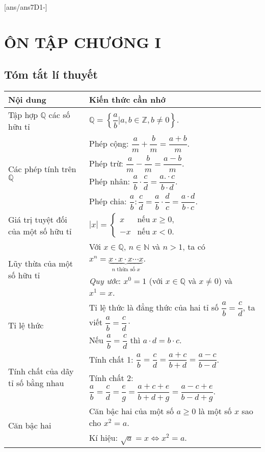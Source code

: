 [ans/ans7D1-]
\section{ÔN TẬP CHƯƠNG I}
\subsection{Tóm tắt lí thuyết}
\begin{center}
{\renewcommand{\arraystretch}{2.1}
\begin{tabular}{| l | l |}
 \hline
\hspace*{2cm}
\textbf{Nội dung}
&\hspace*{3cm}\textbf{Kiến thức cần nhớ}\\
 \hline
Tập hợp $\mathbb{Q}$ các số hữu tỉ&$\mathbb{Q}=\left\{\dfrac{a}{b}\vert a,b\in\mathbb{Z}, b\ne 0\right\}$.\\
\hline
\multirow{4}{5cm}{Các phép tính trên $\mathbb{Q}$}&Phép cộng: $\dfrac{a}{m}+\dfrac{b}{m}=\dfrac{a+b}{m}$.\\&Phép trừ: $\dfrac{a}{m}-\dfrac{b}{m}=\dfrac{a-b}{m}$.\\&Phép nhân: $\dfrac{a}{b}\cdot\dfrac{c}{d}=\dfrac{a.\cdot c}{b\cdot d}$.\\&Phép chia: $\dfrac{a}{b}:\dfrac{c}{d}=\dfrac{a}{b}\cdot\dfrac{d}{c}=\dfrac{a\cdot d}{b\cdot c}$.\\
\hline
Giá trị tuyệt đối của một số hữu tỉ&$|x|=\begin{cases}x&\text{nếu}\; x\ge 0,\\ -x&\text{nếu}\; x<0.\end{cases}$\\
\hline
\multirow{2}{5cm}{Lũy thừa của một số hữu tỉ}&Với $x\in\mathbb{Q}$, $n\in\mathbb{N}$ và $n>1$, ta có $x^n=\underbrace{x\cdot x\cdot x\cdots x}_{n\;\text{thừa số}\;x}$.\\&\textit{Quy ước}: $x^0=1$ (với $x\in\mathbb{Q}$ và $x\ne 0$) và $x^1=x$.\\
\hline
\multirow{2}{5cm}{Tỉ lệ thức}&Tỉ lệ thức là đẳng thức của hai tỉ số $\dfrac{a}{b}=\dfrac{c}{d}$, ta viết $\dfrac{a}{b}=\dfrac{c}{d}\cdot$\\&Nếu $\dfrac{a}{b}=\dfrac{c}{d}$ thì $a\cdot d=b\cdot c$.\\
\hline
\multirow{2}{6.3cm}{Tính chất của dãy tỉ số bằng nhau}&Tính chất 1: $\dfrac{a}{b}=\dfrac{c}{d}=\dfrac{a+c}{b+d}=\dfrac{a-c}{b-d}$.\\&Tính chất 2:  $\dfrac{a}{b}=\dfrac{c}{d}=\dfrac{e}{g}=\dfrac{a+c+e}{b+d+g}=\dfrac{a-c+e}{b-d+g}$.\\
\hline
\multirow{2}{5cm}{Căn bậc hai}&Căn bậc hai của một số $a\ge 0$ là một số $x$ sao cho $x^2=a$.\\&Kí hiệu: $\sqrt{a}=x\Leftrightarrow x^2=a$.\\
\hline
\end{tabular}}
\end{center}

